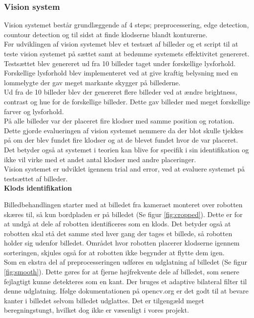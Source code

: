 \subsubsection{Vision system}
Vision systemet består grundlæggende af 4 steps; preprocessering, edge detection, countour detection og til sidst at finde klodserne blandt konturerne. \\

Før udviklingen af vision systemet blev et testsæt af billeder og et script til at teste vision systemet på sættet samt at bedømme systemets effektivitet genereret. Testsættet blev genereret ud fra 10 billeder taget under forskellige lysforhold. Forskellige lysforhold blev implementeret ved at give kraftig belysning med en lommelygte der gav meget markante skygger på billederne. \\

Ud fra de 10 billeder blev der genereret flere billeder ved at ændre brightness, contrast og hue for de forskellige billeder. Dette gav billeder med meget forskellige farver og lysforhold. \\

På alle billeder var der placeret fire klodser med samme position og rotation.
Dette gjorde evalueringen af vision systemet nemmere da der blot skulle tjekkes på om der blev fundet fire klodser og at de blevet fundet hvor de var placeret. Det betyder også at systemet i teorien kan blive for specifik i sin identifikation og ikke vil virke med et andet antal klodser med andre placeringer. \\

Vision systemet er udviklet igennem trial and error, ved at evaluere systemet på testsættet af billeder. \\

\textbf{Klods identifikation}

Billedbehandlingen starter med at billedet fra kameraet monteret over robotten skæres til, så kun bordpladen er på billedet (Se figur \ref{fig:cropped}). Dette er for at undgå at dele af robotten identificeres som en klods.
Det betyder også at robotten skal stå det samme sted hver gang der tages et billede, så robotten holder sig udenfor billedet. Området hvor robotten placerer klodserne igennem sorteringen, skjules også for at robotten ikke begynder at flytte dem igen. \\

Som en ekstra del af preprocesseringen udføres en udglatning af billedet (Se figur \ref{fig:smooth}). Dette gøres for at fjerne højfrekvente dele af billedet, som senere fejlagtigt kunne detekteres som en kant. Der bruges et adaptive bilateral filter til denne udglatning. Ifølge dokumentationen på opencv.org er det godt til at bevare kanter i billedet selvom billedet udglattes. Det er tilgengæld meget beregningstungt, hvilket dog ikke er væsenligt i vores projekt. \\

